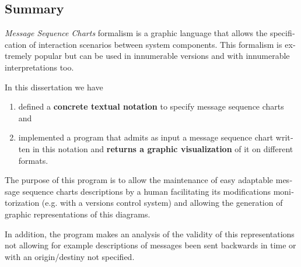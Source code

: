 \begin{otherlanguage}{english}

\chapter*{Summary}

\emph{Message Sequence Charts} formalism is
a graphic language that allows the specification of interaction
scenarios between system components. This formalism is extremely popular but can be used in
innumerable versions and with innumerable interpretations too.

In this dissertation we have
\begin{enumerate}
\item defined a \textbf{concrete textual notation} to specify message
  sequence charts and
\item implemented a program that admits as input a message sequence
  chart written in this notation and \textbf{returns a graphic
  visualization} of it on different formats.
\end{enumerate}

The purpose of this program is to allow the maintenance of easy
adaptable message sequence charts descriptions by a human facilitating
its modifications monitorization (e.g. with a versions control system)
and allowing the generation of graphic representations of this
diagrams.

In addition, the program makes an analysis of the validity of this
representations not allowing for example descriptions of messages been
sent backwards in time or with an origin/destiny not specified.


\end{otherlanguage}

